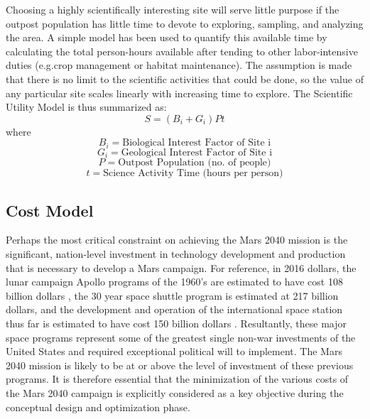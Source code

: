 \documentclass[]{aiaa-pretty}
\begin{document}
Choosing a highly scientifically interesting site will serve little purpose if the outpost population has little time to devote to exploring, sampling, and analyzing the area. A simple model has been used to quantify this available time by calculating the total person-hours available after tending to other labor-intensive duties (e.g.crop management or habitat maintenance). The assumption is made that there is no limit to the scientific activities that could be done, so the value of any particular site scales linearly with increasing time to explore. 
The Scientific Utility Model is thus summarized as:
\begin{equation*}
S=(B_i + G_i) P t
\end{equation*}
where
\begin{equation*}
B_i = \text{Biological Interest Factor of Site i}
\end{equation*}
\begin{equation*}
G_i = \text{Geological Interest Factor of Site i}
\end{equation*}
\begin{equation*}
P = \text{Outpost Population (no. of people)}
\end{equation*}
\begin{equation*}
t = \text{Science Activity Time (hours per person)}
\end{equation*}

\subsection{Cost Model}
Perhaps the most critical constraint on achieving the Mars 2040 mission is the significant, nation-level investment in technology development and production that is necessary to develop a Mars campaign. For reference, in 2016 dollars, the lunar campaign Apollo programs of the 1960’s are estimated to have cost 108 billion dollars \cite{stine2008crs}, the 30 year space shuttle program is estimated at 217 billion dollars, and the development and operation of the international space station thus far is estimated to have cost 150 billion dollars \cite{lafleur2010costs}. Resultantly, these major space programs represent some of the greatest single non-war investments of the United States and required exceptional political will to implement. The Mars 2040 mission is likely to be at or above the level of investment of these previous programs. It is therefore essential that the minimization of the various costs of the Mars 2040 campaign is explicitly considered as a key objective during the conceptual design and optimization phase.
\end{document}
